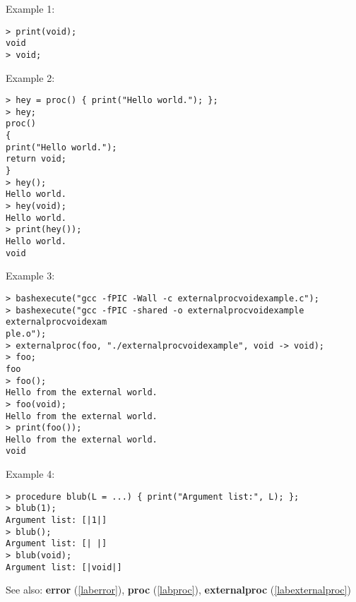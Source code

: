 \noindent Example 1: 
\begin{center}\begin{minipage}{15cm}\begin{Verbatim}[frame=single]
> print(void);
void
> void;
\end{Verbatim}
\end{minipage}\end{center}
\noindent Example 2: 
\begin{center}\begin{minipage}{15cm}\begin{Verbatim}[frame=single]
> hey = proc() { print("Hello world."); };
> hey;
proc()
{
print("Hello world.");
return void;
}
> hey();
Hello world.
> hey(void);
Hello world.
> print(hey());
Hello world.
void
\end{Verbatim}
\end{minipage}\end{center}
\noindent Example 3: 
\begin{center}\begin{minipage}{15cm}\begin{Verbatim}[frame=single]
> bashexecute("gcc -fPIC -Wall -c externalprocvoidexample.c");
> bashexecute("gcc -fPIC -shared -o externalprocvoidexample externalprocvoidexam
ple.o");
> externalproc(foo, "./externalprocvoidexample", void -> void);
> foo;
foo
> foo();
Hello from the external world.
> foo(void);
Hello from the external world.
> print(foo());
Hello from the external world.
void
\end{Verbatim}
\end{minipage}\end{center}
\noindent Example 4: 
\begin{center}\begin{minipage}{15cm}\begin{Verbatim}[frame=single]
> procedure blub(L = ...) { print("Argument list:", L); };
> blub(1);
Argument list: [|1|]
> blub();
Argument list: [| |]
> blub(void); 
Argument list: [|void|]
\end{Verbatim}
\end{minipage}\end{center}
See also: \textbf{error} (\ref{laberror}), \textbf{proc} (\ref{labproc}), \textbf{externalproc} (\ref{labexternalproc})
